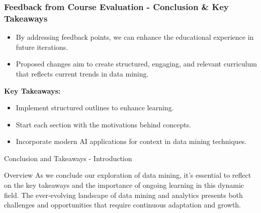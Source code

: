 \documentclass[aspectratio=169]{beamer}
\begin{document}
\begin{frame}[fragile]
    \frametitle{Feedback from Course Evaluation - Conclusion \& Key Takeaways}
    \begin{itemize}
        \item By addressing feedback points, we can enhance the educational experience in future iterations.
        \item Proposed changes aim to create structured, engaging, and relevant curriculum that reflects current trends in data mining.
    \end{itemize}
    
    \textbf{Key Takeaways:}
    \begin{itemize}
        \item Implement structured outlines to enhance learning.
        \item Start each section with the motivations behind concepts.
        \item Incorporate modern AI applications for context in data mining techniques.
    \end{itemize}
\end{frame}

\begin{frame}[fragile]{Conclusion and Takeaways - Introduction}
    \begin{block}{Overview}
        As we conclude our exploration of data mining, it's essential to reflect on the key takeaways and the importance of ongoing learning in this dynamic field. The ever-evolving landscape of data mining and analytics presents both challenges and opportunities that require continuous adaptation and growth.
    \end{block}
\end{frame}
\end{document}
